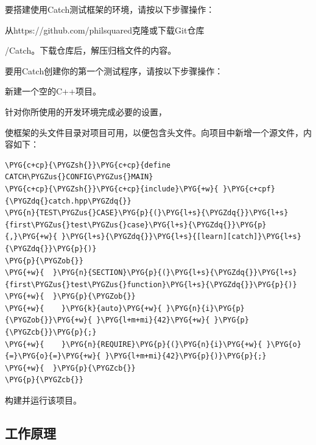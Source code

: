 
要搭建使用Catch测试框架的环境，请按以下步骤操作：



从https://\allowbreak{}github.\allowbreak{}com/\allowbreak{}philsquared克隆或下载Git仓库



/Catch。下载仓库后，解压归档文件的内容。



要用Catch创建你的第一个测试程序，请按以下步骤操作：



新建一个空的C++项目。


针对你所使用的开发环境完成必要的设置，



使框架的头文件目录对项目可用，以便包含头文件。向项目中新增一个源文件，内容如下：



\begin{codeblockbg}
\begin{Verbatim}[commandchars=\\\{\},breaklines=true,breakanywhere=true,fontsize=\codefont,xleftmargin=17bp]
\PYG{c+cp}{\PYGZsh{}}\PYG{c+cp}{define CATCH\PYGZus{}CONFIG\PYGZus{}MAIN}
\PYG{c+cp}{\PYGZsh{}}\PYG{c+cp}{include}\PYG{+w}{ }\PYG{c+cpf}{\PYGZdq{}catch.hpp\PYGZdq{}}
\PYG{n}{TEST\PYGZus{}CASE}\PYG{p}{(}\PYG{l+s}{\PYGZdq{}}\PYG{l+s}{first\PYGZus{}test\PYGZus{}case}\PYG{l+s}{\PYGZdq{}}\PYG{p}{,}\PYG{+w}{ }\PYG{l+s}{\PYGZdq{}}\PYG{l+s}{[learn][catch]}\PYG{l+s}{\PYGZdq{}}\PYG{p}{)}
\PYG{p}{\PYGZob{}}
\PYG{+w}{  }\PYG{n}{SECTION}\PYG{p}{(}\PYG{l+s}{\PYGZdq{}}\PYG{l+s}{first\PYGZus{}test\PYGZus{}function}\PYG{l+s}{\PYGZdq{}}\PYG{p}{)}
\PYG{+w}{  }\PYG{p}{\PYGZob{}}
\PYG{+w}{    }\PYG{k}{auto}\PYG{+w}{ }\PYG{n}{i}\PYG{p}{\PYGZob{}}\PYG{+w}{ }\PYG{l+m+mi}{42}\PYG{+w}{ }\PYG{p}{\PYGZcb{}}\PYG{p}{;}
\PYG{+w}{    }\PYG{n}{REQUIRE}\PYG{p}{(}\PYG{n}{i}\PYG{+w}{ }\PYG{o}{=}\PYG{o}{=}\PYG{+w}{ }\PYG{l+m+mi}{42}\PYG{p}{)}\PYG{p}{;}
\PYG{+w}{  }\PYG{p}{\PYGZcb{}}
\PYG{p}{\PYGZcb{}}
\end{Verbatim}
\end{codeblockbg}



构建并运行该项目。



\subsection{工作原理}


